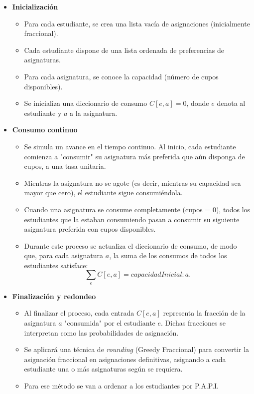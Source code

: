 \documentclass{article}
\begin{document}
\begin{itemize}
  \item \textbf{Inicialización}
        \begin{itemize}
          \item Para cada estudiante, se crea una lista vacía de asignaciones (inicialmente fraccional).
          \item Cada estudiante dispone de una lista ordenada de preferencias de asignaturas.
          \item Para cada asignatura, se conoce la capacidad (número de cupos disponibles).
          \item Se inicializa una diccionario de consumo $C[e,a] = 0$, donde $e$ denota al estudiante y 
          $a$ a la asignatura.
        \end{itemize}

  \item \textbf{Consumo continuo}
        \begin{itemize}
          \item Se simula un avance en el tiempo continuo. Al inicio, cada estudiante comienza a 
          "consumir" su asignatura más preferida que aún disponga de cupos, a una tasa unitaria.
          \item Mientras la asignatura no se agote (es decir, mientras su capacidad sea mayor que cero), 
          el estudiante sigue consumiéndola.
          \item Cuando una asignatura se consume completamente (cupos = 0), todos los estudiantes que la 
          estaban consumiendo pasan a consumir su siguiente asignatura preferida con cupos disponibles.
          \item Durante este proceso se actualiza el diccionario de consumo, de modo que, para cada 
          asignatura $a$, la suma de los consumos de todos los estudiantes satisface:
          $$
          \sum_{e} C[e,a] = capacidadInicial: a.
          $$
        \end{itemize}

  \item \textbf{Finalización y redondeo}
        \begin{itemize}
          \item Al finalizar el proceso, cada entrada $C[e,a]$ representa la fracción de la 
          asignatura $a$ "consumida" por el estudiante $e$. Dichas fracciones se interpretan como 
          las probabilidades de asignación.
          \item Se aplicará una técnica de \textit{rounding} (Greedy Fraccional) para convertir 
          la asignación fraccional en asignaciones definitivas, 
          asignando a cada estudiante una o más asignaturas según se requiera.
          \item Para ese método se van a ordenar a los estudiantes por P.A.P.I.
        \end{itemize}
\end{itemize}
\end{document}
